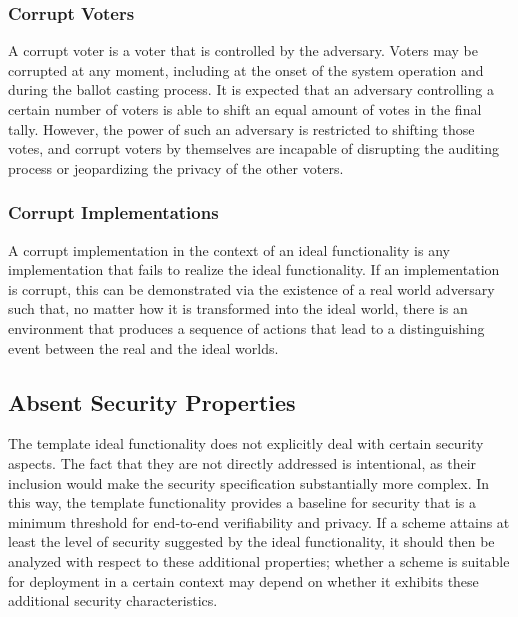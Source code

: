 \subsubsection{Corrupt Voters} 

A corrupt voter is a voter that is controlled by the adversary. Voters
may be corrupted at any moment, including at the onset of the system
operation and during the ballot casting process. It is expected that
an adversary controlling a certain number of voters is able to shift
an equal amount of votes in the final tally. However, the power of
such an adversary is restricted to shifting those votes, and corrupt
voters by themselves are incapable of disrupting the auditing process
or jeopardizing the privacy of the other voters.

\subsubsection{Corrupt Implementations} 

A corrupt implementation in the context of an ideal functionality is
any implementation that fails to realize the ideal functionality. If
an implementation is corrupt, this can be demonstrated via the
existence of a real world adversary such that, no matter how it is
transformed into the ideal world, there is an environment that
produces a sequence of actions that lead to a distinguishing event
between the real and the ideal worlds.

\subsection{Absent Security Properties}

The template ideal functionality does not explicitly deal with certain
security aspects. The fact that they are not directly addressed is
intentional, as their inclusion would make the security specification
substantially more complex. In this way, the template functionality
provides a baseline for security that is a minimum threshold for
end-to-end verifiability and privacy. If a scheme attains at least the
level of security suggested by the ideal functionality, it should then
be analyzed with respect to these additional properties; whether a
scheme is suitable for deployment in a certain context may depend on
whether it exhibits these additional security characteristics.

